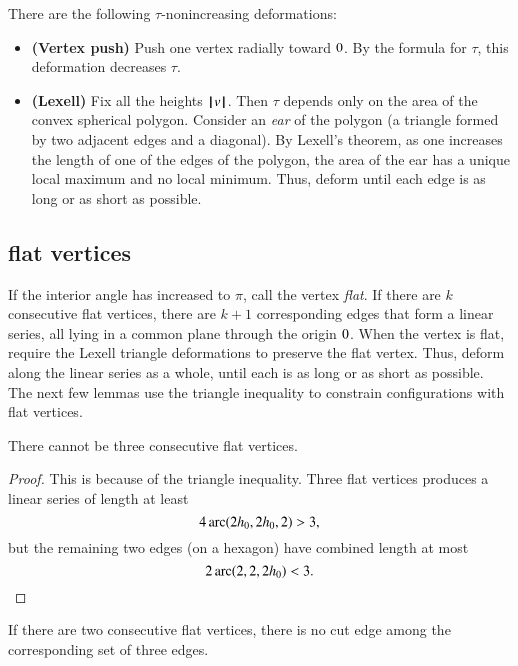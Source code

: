 There are the following $\tau$-nonincreasing deformations:
\begin{itemize}
\item {\bf (Vertex push)} Push one vertex radially toward $0$.  By the formula for $\tau$, this deformation decreases $\tau$.
\item {\bf (Lexell)} Fix all the heights ${{\hskip0.1em|\hskip-0.15em|\hskip0.1em}v{\hskip0.1em|\hskip-0.15em|\hskip0.1em}}$. Then $\tau$ depends only on the area of the convex spherical polygon.  Consider an {\it ear} of the polygon (a triangle formed by two adjacent edges and a diagonal).  By Lexell's theorem, as one increases the length of one of the edges of the polygon, the area of the ear has a unique local maximum and no local minimum.  Thus,  deform until each edge is as long or as short as possible.
\end{itemize}

\subsection{flat vertices}


If the interior angle has increased to $\pi$, call the vertex {\it flat}. If there are $k$ consecutive flat vertices, there are  $k+1$ corresponding edges that form a linear series, all lying in a common plane through the origin $0$.  When the vertex is flat, require the Lexell triangle deformations to preserve the flat vertex.  Thus,  deform along the linear series as a whole, until each is as long or as short as possible.  The next few lemmas use the triangle inequality to constrain configurations with flat vertices.

\begin{lemma}
There cannot be three consecutive flat vertices.
\end{lemma}

\begin{proof} This is because of the triangle inequality.  Three flat vertices produces a linear series of length at least
$$
4\operatorname{arc}(2{h_0},2{h_0},2) > 3,
$$
but the remaining two edges (on a hexagon) have combined length at most
$$
2\operatorname{arc}(2,2,2{h_0}) < 3.
$$
\end{proof}

\begin{lemma}
If there are two consecutive flat vertices, there is no cut edge among the corresponding set of three edges.
\end{lemma}

